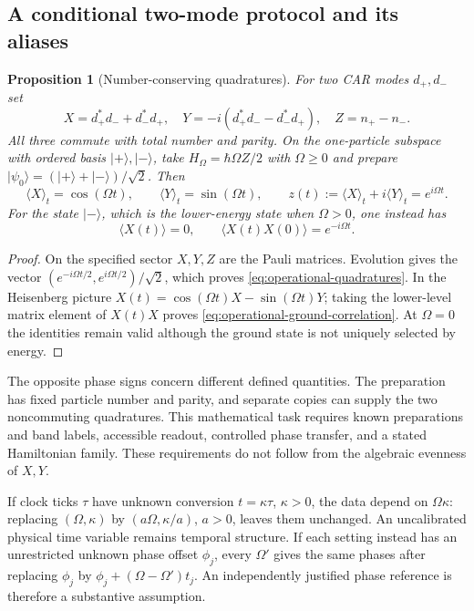 \documentclass[11pt]{article}
\newtheorem{proposition}[theorem]{Proposition}
\theoremstyle{definition}
\begin{document}
\subsection{A conditional two-mode protocol and its aliases}

\begin{proposition}[Number-conserving quadratures]
\label{prop:operational-two-mode}
For two CAR modes $d_+,d_-$ set
\[
 X=d_+^*d_-+d_-^*d_+,
 \quad Y=-i(d_+^*d_--d_-^*d_+),
 \quad Z=n_+-n_-.
\]
All three commute with total number and parity. On the one-particle
subspace with ordered basis $|+\rangle,|-\rangle$, take
$H_\Omega=\hbar\Omega Z/2$ with $\Omega\ge0$ and prepare
$|\psi_0\rangle=(|+\rangle+|-\rangle)/\sqrt2$. Then
\begin{equation}
 \langle X\rangle_t=\cos(\Omega t),\qquad
 \langle Y\rangle_t=\sin(\Omega t),\qquad
 z(t):=\langle X\rangle_t+i\langle Y\rangle_t=e^{i\Omega t}.
 \label{eq:operational-quadratures}
\end{equation}
For the state $|-\rangle$, which is the lower-energy state when
$\Omega>0$, one instead has
\begin{equation}
 \langle X(t)\rangle=0,
 \qquad\langle X(t)X(0)\rangle=e^{-i\Omega t}.
 \label{eq:operational-ground-correlation}
\end{equation}
\end{proposition}
\begin{proof}
On the specified sector $X,Y,Z$ are the Pauli matrices. Evolution gives
the vector $(e^{-i\Omega t/2},e^{i\Omega t/2})/\sqrt2$, which proves
\eqref{eq:operational-quadratures}. In the Heisenberg picture
$X(t)=\cos(\Omega t)X-\sin(\Omega t)Y$; taking the lower-level matrix
element of $X(t)X$ proves \eqref{eq:operational-ground-correlation}.
At $\Omega=0$ the identities remain valid although the ground state is
not uniquely selected by energy.
\end{proof}

The opposite phase signs concern different defined quantities. The
preparation has fixed particle number and parity, and separate copies
can supply the two noncommuting quadratures. This mathematical task
requires known preparations and band labels, accessible readout,
controlled phase transfer, and a stated Hamiltonian family. These
requirements do not follow from the algebraic evenness of $X,Y$.

If clock ticks $\tau$ have unknown conversion $t=\kappa\tau$, $\kappa>0$,
the data depend on $\Omega\kappa$: replacing
$(\Omega,\kappa)$ by $(a\Omega,\kappa/a)$, $a>0$, leaves them unchanged.
An uncalibrated physical time variable remains temporal structure.
If each setting instead has an unrestricted unknown phase offset
$\phi_j$, every $\Omega'$ gives the same phases after replacing
$\phi_j$ by $\phi_j+(\Omega-\Omega')t_j$. An independently justified
phase reference is therefore a substantive assumption.
\end{document}
